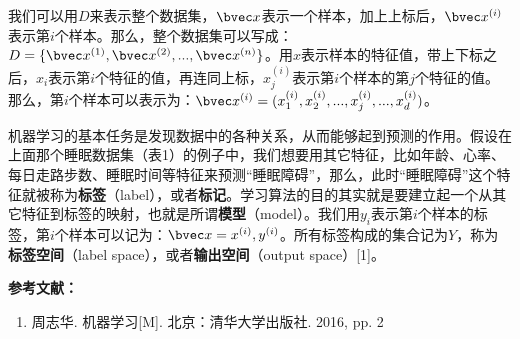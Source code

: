 我们可以用$D$来表示整个数据集，$\bvec x$表示一个样本，加上上标后，$\bvec x^{(i)}$表示第$i$个样本。那么，整个数据集可以写成：$D=\{\bvec x^{(1)}, \bvec x^{(2)}, ..., \bvec x^{(n)}\}$。用$x$表示样本的特征值，带上下标之后，$x_i$表示第$i$个特征的值，再连同上标，$x^{(i)}_j$表示第$i$个样本的第$j$个特征的值。那么，第$i$个样本可以表示为：$\bvec x^{(i)}=(x^{(i)}_1, x^{(i)}_2, ..., x^{(i)}_j, ..., x^{(i)}_d)$。

机器学习的基本任务是发现数据中的各种关系，从而能够起到预测的作用。假设在上面那个睡眠数据集（表1）的例子中，我们想要用其它特征，比如年龄、心率、每日走路步数、睡眠时间等特征来预测“睡眠障碍”，那么，此时“睡眠障碍”这个特征就被称为\textbf{标签}（label），或者\textbf{标记}。学习算法的目的其实就是要建立起一个从其它特征到标签的映射，也就是所谓\textbf{模型}（model）。我们用$y_i$表示第$i$个样本的标签，第$i$个样本可以记为：$\bvec x=x^{(i)}, y^{(i)}$。所有标签构成的集合记为$Y$，称为\textbf{标签空间}（label space），或者\textbf{输出空间}（output space）[1]。


\textbf{参考文献：}
\begin{enumerate}
\item 周志华. 机器学习[M]. 北京：清华大学出版社. 2016, pp. 2
\end{enumerate}
